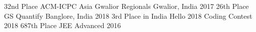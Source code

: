 \begin{cvhonors}
  \cvhonor
    {32nd Place}
    {ACM-ICPC Asia Gwalior Regionals}
    {Gwalior, India}
    {2017}
  \cvhonor
    {26th Place}
    {GS Quantify}
    {Banglore, India}
    {2018}
  \cvhonor
    {3rd Place in India}
    {Hello 2018 Coding Contest}
    {}
    {2018}
  \cvhonor
    {687th Place}
    {JEE Advanced}
    {}
    {2016}

\end{cvhonors}
